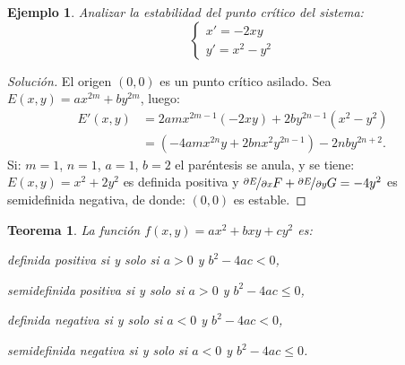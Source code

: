 \documentclass[a5paper,doc,10pt,noapacite]{apa6}
\newtheorem{teorema}{Teorema}
\newtheorem{ejem}{Ejemplo}
\begin{document}
{{\begin{ejem}
	Analizar la estabilidad del punto crítico del sistema:
	\[
	\begin{cases}
		x'=-2xy
		\\
		y'=x^2-y^2
	\end{cases}
	\]
\end{ejem}
	\begin{proof}[Solución]
		El origen \((0,0)\) es un punto crítico asilado. Sea \(E(x,y)=ax^{2m}+by^{2m}\), luego:
		\begin{align*}
			E'(x,y)&=2amx^{2m-1}(-2xy)+2by^{2n-1}(x^2-y^2)\\
				&=\left(-4amx^{2n}y+2bnx^2y^{2n-1}\right)-2nby^{2n+2} .
		\end{align*}
		Si: \(m=1\), \(n=1\), \(a=1\), \(b=2\) el paréntesis se anula, y se tiene: \(E(x,y)=x^2+2y^2\) es definida positiva y \(\nicefrac{\partial E}{\partial x}F+\nicefrac{\partial E}{\partial y}G=-4y^2\) es semidefinida negativa, de donde: \((0,0)\) es estable.
	\end{proof}



\begin{teorema}
	La función \(f(x,y)=ax^2+bxy+cy^2\) es:
	\begin{APAitemize}
		\item definida positiva si y solo si  \(a>0\) y \(b^2-4ac<0\),
		\item semidefinida positiva si y solo si \(a>0\) y \(b^2-4ac\leq 0\),
		\item definida negativa si y solo si \(a<0\) y \(b^2-4ac<0\),
		\item semidefinida negativa si y solo si \(a<0\) y \(b^2-4ac\leq 0\).
	\end{APAitemize}
\end{teorema}


%
%
%
}}
\end{document}

